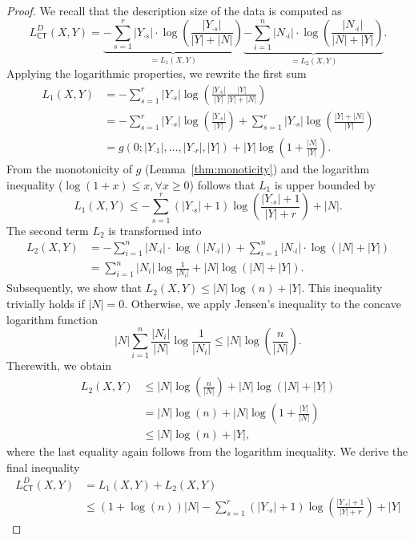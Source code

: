 \begin{proof}
We recall that the description size of the data is computed as
\[L_{\mathsf{CT}}^D(X,Y)=\underbrace{-\sum_{s=1}^r |Y_{\cdot s}| \cdot \log\left(\frac{|Y_{\cdot s}|}{|Y|+|N|}\right)}_{=L_1(X,Y)}
       \underbrace{-\sum_{i=1}^n |N_{\cdot i}| \cdot \log\left(\frac{|N_{\cdot i}|}{|N|+|Y|}\right)}_{=L_2(X,Y)}.
\]
Applying the logarithmic properties, we rewrite the first sum 
\begin{align*}
 L_1(X,Y)&= -\sum_{s=1}^r|Y_{\cdot s}|\log\left(\frac{|Y_{\cdot s}|}{|Y|}\frac{|Y|}{|Y|+|N|}\right)\\
 &= -\sum_{s=1}^r|Y_{\cdot s}|\log\left(\frac{|Y_{\cdot s}|}{|Y|}\right)+\sum_{s=1}^r|Y_{\cdot s}|\log\left(\frac{|Y|+|N|}{|Y|}\right)\\
 &= g(0;|Y_{\cdot 1}|,\ldots,|Y_{\cdot r}|,|Y|) +|Y|\log\left(1+\frac{|N|}{|Y|}\right). %
\end{align*}
From the monotonicity of $g$ (Lemma~\ref{thm:monoticity}) and the logarithm inequality ($\log(1+x)\leq x, \forall x\geq 0$) follows that $L_1$ is upper bounded by
\[L_1(X,Y)\leq-\sum_{s=1}^r(|Y_{\cdot s}|+1)\log\left(\frac{|Y_{\cdot s}|+1}{|Y|+r}\right)+|N|.\]
The second term $L_2$ is transformed into
\begin{align*}
    L_2(X,Y)&=-\sum_{i=1}^n |N_{\cdot i}| \cdot \log\left(|N_{\cdot i}|\right)+\sum_{i=1}^n |N_{\cdot i}| \cdot \log\left(|N|+|Y|\right)\\
    &= \sum_{i=1}^n|N_i|\log\frac{1}{|N_i|} +|N|\log(|N|+|Y|).
\end{align*}
Subsequently, we show that $L_2(X,Y)\leq |N|\log(n) +|Y|$. This inequality trivially holds if $|N|=0$. Otherwise, we apply Jensen's inequality to the concave logarithm function
	\[|N|\sum_{i=1}^n\frac{|N_i|}{|N|}\log\frac{1}{|N_i|}\leq |N|\log\left(\frac{n}{|N|}\right).\]
Therewith, we obtain 
\begin{align*}
    L_2(X,Y)&\leq|N|\log\left(\frac{n}{|N|}\right) +|N|\log(|N|+|Y|)\\ &= |N|\log(n) +|N|\log\left(1+\frac{|Y|}{|N|}\right) \\
    &\leq |N|\log(n) +|Y|,
\end{align*}
where the last equality again follows from the logarithm inequality. We derive the final inequality 
\begin{align*}
L_{\mathsf{CT}}^D(X,Y) &= L_1(X,Y)+L_2(X,Y)\\
&\leq (1+\log(n))|N|-\sum_{s=1}^r(|Y_{\cdot s}|+1)\log\left(\frac{|Y_{\cdot s}|+1}{|Y|+r}\right)+|Y|
\end{align*}
\end{proof}
